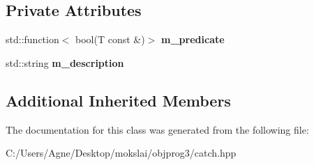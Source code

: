 \subsection*{Private Attributes}
\begin{DoxyCompactItemize}
\item 
\mbox{\label{class_catch_1_1_matchers_1_1_generic_1_1_predicate_matcher_ab7f09e9f96fb9d794e1fc699497ec3e0}} 
std\+::function$<$ bool(T const  \&)$>$ {\bfseries m\+\_\+predicate}
\item 
\mbox{\label{class_catch_1_1_matchers_1_1_generic_1_1_predicate_matcher_a7736732e65a93e4e1f889804d043407e}} 
std\+::string {\bfseries m\+\_\+description}
\end{DoxyCompactItemize}
\subsection*{Additional Inherited Members}


The documentation for this class was generated from the following file\+:\begin{DoxyCompactItemize}
\item 
C\+:/\+Users/\+Agne/\+Desktop/mokslai/objprog3/catch.\+hpp\end{DoxyCompactItemize}
